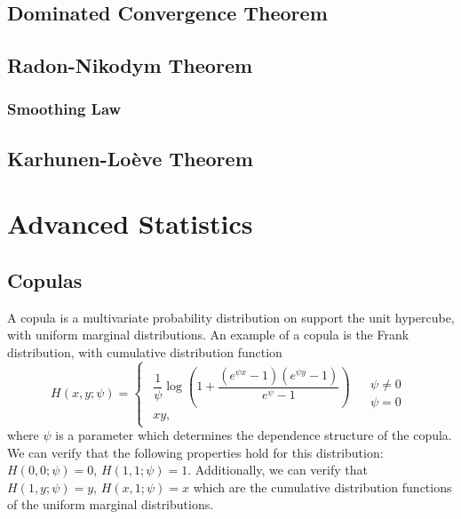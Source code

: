 \documentclass[11pt]{report} %
\begin{document}
\section{Dominated Convergence Theorem}

\section{Radon-Nikodym Theorem}

\subsection{Smoothing Law}

\section{Karhunen-Lo\`eve Theorem}


\chapter{Advanced Statistics}

\section{Copulas}

A copula is a multivariate probability distribution on support the unit hypercube, with uniform marginal distributions. An example of a copula is the Frank distribution, with cumulative distribution function
\begin{equation}
H\left(x, y; \psi\right) = \begin{cases}
\begin{array}{c}
\dfrac{1}{\psi}\log\left(1+\dfrac{\left(e^{\psi x}-1\right)\left(e^{\psi y}-1\right)}{e^{\psi}-1}\right)\\
xy,
\end{array} & \begin{array}{c}
\psi\neq0\\
\psi=0
\end{array}\end{cases}
\end{equation}
where $\psi$ is a parameter which determines the dependence structure of the copula. We can verify that the following properties hold for this distribution: $H\left(0, 0; \psi\right) = 0$, $H\left(1, 1; \psi\right) = 1$. Additionally, we can verify that $H\left(1, y; \psi\right) = y$, $H\left(x, 1; \psi\right) = x$ which are the cumulative distribution functions of the uniform marginal distributions. \\
\end{document}
